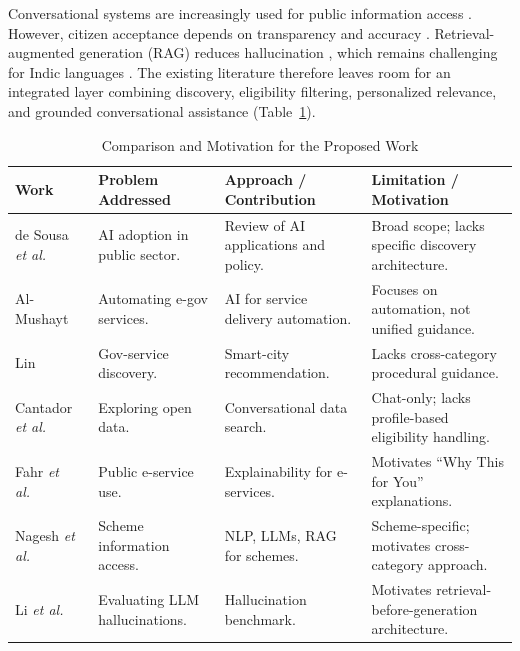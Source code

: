 \documentclass[conference]{IEEEtran}
\begin{document}
Conversational systems are increasingly used for public information access \cite{cantador2021,cortes2023,abhiyan2025}. However, citizen acceptance depends on transparency and accuracy \cite{horvath2023}. Retrieval-augmented generation (RAG) \cite{lewis2020,karpukhin2020} reduces hallucination \cite{halueval2023}, which remains challenging for Indic languages \cite{singh2024,singh2025}. The existing literature therefore leaves room for an integrated layer combining discovery, eligibility filtering, personalized relevance, and grounded conversational assistance (Table~\ref{tab:comparison-motivation}).

\begin{table}[!t]
\caption{Comparison and Motivation for the Proposed Work}
\label{tab:comparison-motivation}
\centering
\footnotesize
\setlength{\tabcolsep}{4pt}
\renewcommand{\arraystretch}{1.1}
\begin{tabular}{p{} p{} p{} p{}}
\hline
\textbf{Work} & \textbf{Problem Addressed} & \textbf{Approach / Contribution} & \textbf{Limitation / Motivation} \\
\hline
de Sousa \textit{et al.}~\cite{souza2019} & AI adoption in public sector. & Review of AI applications and policy. & Broad scope; lacks specific discovery architecture. \\
Al-Mushayt~\cite{almushayt2019} & Automating e-gov services. & AI for service delivery automation. & Focuses on automation, not unified guidance. \\
Lin~\cite{lin2022} & Gov-service discovery. & Smart-city recommendation. & Lacks cross-category procedural guidance. \\
Cantador \textit{et al.}~\cite{cantador2021} & Exploring open data. & Conversational data search. & Chat-only; lacks profile-based eligibility handling. \\
Fahr \textit{et al.}~\cite{fahr2025} & Public e-service use. & Explainability for e-services. & Motivates ``Why This for You'' explanations. \\
Nagesh \textit{et al.}~\cite{abhiyan2025} & Scheme information access. & NLP, LLMs, RAG for schemes. & Scheme-specific; motivates cross-category approach. \\
Li \textit{et al.}~\cite{halueval2023} & Evaluating LLM hallucinations. & Hallucination benchmark. & Motivates retrieval-before-generation architecture. \\
\hline
\end{tabular}
\end{table}
\end{document}
